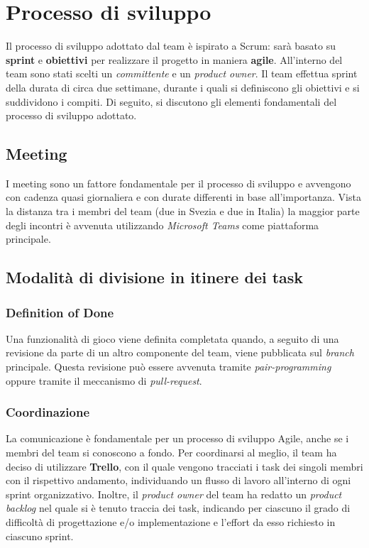 \newpage
\section{Processo di sviluppo}
\label{sec:development}
Il processo di sviluppo adottato dal team è ispirato a Scrum: sarà basato su \textbf{sprint} e \textbf{obiettivi}
per realizzare il progetto in maniera \textbf{agile}.
All'interno del team sono stati scelti un \textit{committente} e un \textit{product owner}.
Il team effettua sprint della durata di circa due settimane, durante i quali si definiscono gli obiettivi e si suddividono i compiti.
Di seguito, si discutono gli elementi fondamentali del processo di sviluppo adottato.

\subsection{Meeting}
I meeting sono un fattore fondamentale per il processo di sviluppo e avvengono con cadenza quasi giornaliera
e con durate differenti in base all'importanza. Vista la distanza tra i membri del
team (due in Svezia e due in Italia) la maggior parte degli incontri è avvenuta
utilizzando \textit{Microsoft Teams} come piattaforma principale.

\subsection{Modalità di divisione in itinere dei task}

\subsubsection{Definition of Done}
Una funzionalità di gioco viene definita completata quando, a seguito di una revisione da parte
di un altro componente del team, viene pubblicata sul \textit{branch} principale. Questa revisione può essere avvenuta
tramite \textit{pair-programming} oppure tramite il meccanismo di \textit{pull-request}.

\subsubsection{Coordinazione}
La comunicazione è fondamentale per un processo di sviluppo Agile, anche se i membri del team si conoscono a fondo.
Per coordinarsi al meglio, il team ha deciso di utilizzare \textbf{Trello},
con il quale vengono tracciati i task dei singoli membri con il rispettivo andamento,
individuando un flusso di lavoro all'interno di ogni sprint organizzativo.
Inoltre, il \textit{product owner} del team ha redatto un \textit{product backlog} nel
quale si è tenuto traccia dei task, indicando
per ciascuno il grado di difficoltà di progettazione e/o implementazione e l'effort da esso richiesto in ciascuno sprint.

